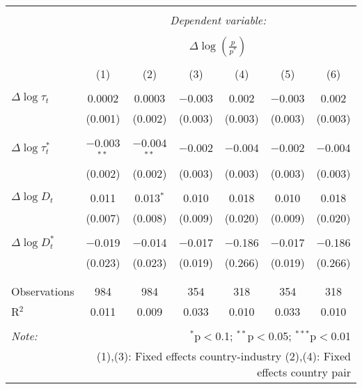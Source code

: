 
\begin{tabular}{@{\extracolsep{5pt}}lcccccc} 
\\[-1.8ex]\hline 
\hline \\[-1.8ex] 
 & \multicolumn{6}{c}{\textit{Dependent variable:}} \\ 
\cline{2-7} 
\\[-1.8ex] & \multicolumn{6}{c}{$\Delta \log \left(\frac{p}{p^*} \right)$} \\ 
\\[-1.8ex] & (1) & (2) & (3) & (4) & (5) & (6)\\ 
\hline \\[-1.8ex] 
 $\Delta \log \tau_t$ & 0.0002 & 0.0003 & $-$0.003 & 0.002 & $-$0.003 & 0.002 \\ 
  & (0.001) & (0.002) & (0.003) & (0.003) & (0.003) & (0.003) \\ 
  & & & & & & \\ 
 $\Delta \log \tau_t^*$ & $-$0.003$^{**}$ & $-$0.004$^{**}$ & $-$0.002 & $-$0.004 & $-$0.002 & $-$0.004 \\ 
  & (0.002) & (0.002) & (0.003) & (0.003) & (0.003) & (0.003) \\ 
  & & & & & & \\ 
 $\Delta \log D_t$ & 0.011 & 0.013$^{*}$ & 0.010 & 0.018 & 0.010 & 0.018 \\ 
  & (0.007) & (0.008) & (0.009) & (0.020) & (0.009) & (0.020) \\ 
  & & & & & & \\ 
 $\Delta \log D_t^*$ & $-$0.019 & $-$0.014 & $-$0.017 & $-$0.186 & $-$0.017 & $-$0.186 \\ 
  & (0.023) & (0.023) & (0.019) & (0.266) & (0.019) & (0.266) \\ 
  & & & & & & \\ 
\hline \\[-1.8ex] 
Observations & 984 & 984 & 354 & 318 & 354 & 318 \\ 
R$^{2}$ & 0.011 & 0.009 & 0.033 & 0.010 & 0.033 & 0.010 \\ 
\hline 
\hline \\[-1.8ex] 
\textit{Note:}  & \multicolumn{6}{r}{$^{*}$p$<$0.1; $^{**}$p$<$0.05; $^{***}$p$<$0.01} \\ 
 & \multicolumn{6}{r}{(1),(3): Fixed effects country-industry (2),(4): Fixed effects country pair} \\ 
\end{tabular} 
